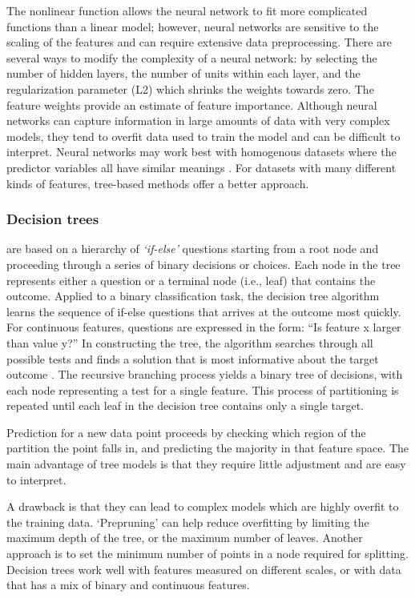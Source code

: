 \documentclass[sigconf]{acmart}
\begin{document}
The nonlinear function allows the neural 
network to fit more complicated functions than a linear model; however, 
neural networks are sensitive to the scaling of the features and can require
extensive data preprocessing. There are several ways to modify the complexity 
of a neural network: by selecting the number of hidden layers, the number of 
units within each layer, and the regularization parameter (L2) which shrinks 
the weights towards zero. The feature weights provide an estimate of feature 
importance. Although neural networks can capture information in large amounts 
of data with very complex models, they tend to overfit data used to train the 
model and can be difficult to interpret. Neural networks may work best with 
homogenous datasets where the predictor variables all have similar meanings 
\cite{muhuri13}. For datasets with many different kinds of features, 
tree-based methods offer a better approach.


\subsubsection{Decision trees} are based on a hierarchy of \emph{`if-else'}
questions starting from a root node and proceeding through a series of binary decisions or choices. Each node in the tree represents either 
a question or a terminal node (i.e., leaf) that contains the outcome. Applied to 
a binary classification task, the decision tree algorithm learns the sequence
of if-else questions that arrives at the outcome most quickly. For continuous 
features, questions are expressed in the form: ``Is feature x larger than 
value y?'' In constructing the tree, the algorithm searches through all 
possible tests and finds a solution that is most informative about the target 
outcome \cite{muller17}. The recursive branching process yields a binary tree 
of decisions, with each node representing a test for a single feature. This 
process of partitioning is repeated until each leaf in the decision tree 
contains only a single target. 


Prediction for a new data point proceeds by 
checking which region of the partition the point falls in, and predicting the 
majority in that feature space. The main advantage of tree models is that they 
require little adjustment and are easy to interpret. 

A drawback is that they 
can lead to complex models which are highly overfit to the training data. 
`Prepruning' can help reduce overfitting by limiting the maximum depth of the 
tree, or the maximum number of leaves. Another approach is to set the minimum 
number of points in a node required for splitting. Decision trees work well 
with features measured on different scales, or with data that has a mix of 
binary and continuous features. 
\end{document}
